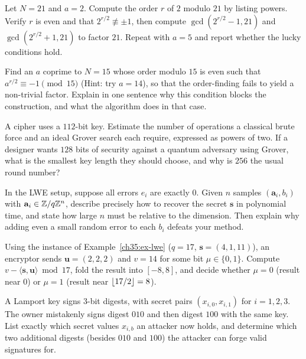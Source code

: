 \begin{exercise}
Let $N=21$ and $a=2$. Compute the order $r$ of $2$ modulo $21$ by listing powers. Verify $r$ is even and that $2^{r/2}\not\equiv\pm1$, then compute $\gcd(2^{r/2}-1,21)$ and $\gcd(2^{r/2}+1,21)$ to factor $21$. Repeat with $a=5$ and report whether the lucky conditions hold.
\end{exercise}

\begin{exercise}
Find an $a$ coprime to $N=15$ whose order modulo $15$ is even such that $a^{r/2} \equiv -1 \pmod{15}$ (Hint: try $a=14$), so that the order-finding fails to yield a non-trivial factor. Explain in one sentence why this condition blocks the construction, and what the algorithm does in that case.
\end{exercise}

\begin{exercise}
A cipher uses a $112$-bit key. Estimate the number of operations a classical brute force and an ideal Grover search each require, expressed as powers of two. If a designer wants $128$ bits of security against a quantum adversary using Grover, what is the smallest key length they should choose, and why is $256$ the usual round number?
\end{exercise}

\begin{exercise}
In the LWE setup, suppose all errors $e_i$ are exactly $0$. Given $n$ samples $(\mathbf a_i, b_i)$ with $\mathbf a_i\in\mathbb{Z}/q\mathbb{Z}^n$, describe precisely how to recover the secret $\mathbf s$ in polynomial time, and state how large $n$ must be relative to the dimension. Then explain why adding even a small random error to each $b_i$ defeats your method.
\end{exercise}

\begin{exercise}
Using the instance of Example~\ref{ch35:ex-lwe} ($q=17$, $\mathbf s=(4,1,11)$), an encryptor sends $\mathbf u=(2,2,2)$ and $v=14$ for some bit $\mu\in\{0,1\}$. Compute $v-\langle\mathbf s,\mathbf u\rangle \bmod 17$, fold the result into $[-8,8]$, and decide whether $\mu=0$ (result near $0$) or $\mu=1$ (result near $\lfloor17/2\rfloor=8$).
\end{exercise}

\begin{exercise}
A Lamport key signs $3$-bit digests, with secret pairs $(x_{i,0},x_{i,1})$ for $i=1,2,3$. The owner mistakenly signs digest $010$ and then digest $100$ with the same key. List exactly which secret values $x_{i,b}$ an attacker now holds, and determine which two additional digests (besides $010$ and $100$) the attacker can forge valid signatures for.
\end{exercise}

